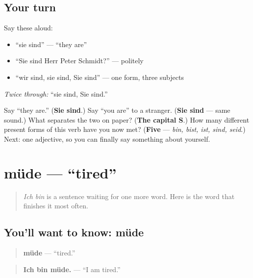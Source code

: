\subsection*{Your turn}
Say these aloud:

\begin{itemize}
\raggedright
  \item \textquotedblleft{}sie sind\textquotedblright{} — \textquotedblleft{}they are\textquotedblright{}
  \item \textquotedblleft{}Sie sind Herr Peter Schmidt?\textquotedblright{} — politely
  \item \textquotedblleft{}wir sind, sie sind, Sie sind\textquotedblright{} — one form, three subjects
\end{itemize}

\emph{Twice through:} \textquotedblleft{}sie sind, Sie sind.\textquotedblright{}

\begin{tcolorbox}[breakable,colback=teal!4,colframe=teal!35!black,title={Before you move on}]
Say \textquotedblleft{}they are.\textquotedblright{} (\textbf{Sie sind}.) Say \textquotedblleft{}you are\textquotedblright{} to a stranger. (\textbf{Sie sind} — same sound.) What separates the two on paper? (\textbf{The capital S}.) How many different present forms of this verb have you now met? (\textbf{Five} — \emph{bin, bist, ist, sind, seid}.) Next: one adjective, so you can finally say something about yourself.
\end{tcolorbox}
\section[müde]{müde — \textquotedblleft{}tired\textquotedblright{}}

\label{lesson:GE-C16-muede}



\begin{quote}
\emph{Ich bin} is a sentence waiting for one more word. Here is the word that finishes it most often.
\end{quote}

\subsection*{You'll want to know: müde}
\begin{quote}
\textbf{müde} — \textquotedblleft{}tired.\textquotedblright{}
\end{quote}

\begin{quote}
\textbf{Ich bin müde.} — \textquotedblleft{}I am tired.\textquotedblright{}
\end{quote}


